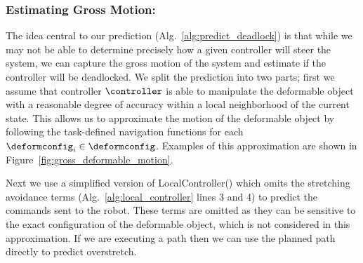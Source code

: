 \subsubsection{Estimating Gross Motion:}

The idea central to our prediction (Alg.~\ref{alg:predict_deadlock}) is that while we may not be able to determine precisely how a given controller will steer the system, we can capture the gross motion of the system and estimate if the controller will be deadlocked. We split the prediction into two parts; first we assume that controller $\controller$ is able to manipulate the deformable object with a reasonable degree of accuracy within a local neighborhood of the current state. This allows us to approximate the motion of the deformable object by following the task-defined navigation functions for each $\deformconfig_i \in \deformconfig$. Examples of this approximation are shown in Figure~\ref{fig:gross_deformable_motion}.

Next we use a simplified version of LocalController() which omits the stretching avoidance terms (Alg.~\ref{alg:local_controller} lines 3 and 4) to predict the commands sent to the robot. These terms are omitted as they can be sensitive to the exact configuration of the deformable object, which is not considered in this approximation. If we are executing a path then we can use the planned path directly to predict overstretch.



